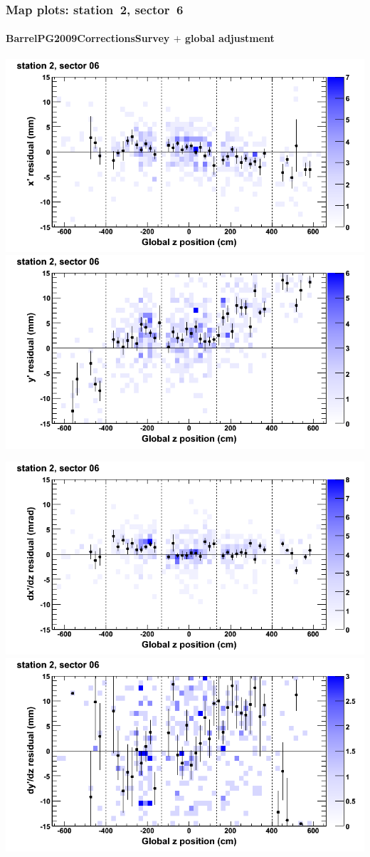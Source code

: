 \documentclass[compress]{beamer}
\begin{document}
\begin{frame}
\frametitle{Map plots: station~2, sector~6}
\framesubtitle{BarrelPG2009CorrectionsSurvey $+$ global adjustment}
\includegraphics[width=0.5\linewidth]{mapplots_re01/DTvsz_st2sec06_x.png}
\includegraphics[width=0.5\linewidth]{mapplots_re01/DTvsz_st2sec06_y.png}

\includegraphics[width=0.5\linewidth]{mapplots_re01/DTvsz_st2sec06_dxdz.png}
\includegraphics[width=0.5\linewidth]{mapplots_re01/DTvsz_st2sec06_dydz.png}
\end{frame}
\end{document}
